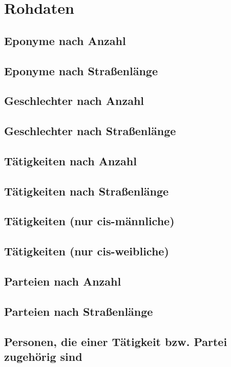 \documentclass[ngerman,twocolumn,showpacs,%
  nofootinbib,aps,superscriptaddress,%
  eqsecnum,prd,notitlepage,showkeys,10pt,report]{revtex4-2}
\begin{document}
\section{Rohdaten}
\subsection{Eponyme nach Anzahl}
\subsection{Eponyme nach Straßenlänge}
\subsection{Geschlechter nach Anzahl}
\subsection{Geschlechter nach Straßenlänge}
\subsection{Tätigkeiten nach Anzahl}
\subsection{Tätigkeiten nach Straßenlänge}
\subsection{Tätigkeiten (nur cis-männliche)}
\subsection{Tätigkeiten (nur cis-weibliche)}
\subsection{Parteien nach Anzahl}
\subsection{Parteien nach Straßenlänge}
\subsection{Personen, die einer Tätigkeit bzw. Partei zugehörig sind}
\end{document}

